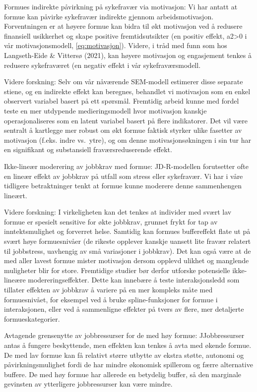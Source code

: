 \documentclass[
  12pt,
  a4paper,
  DIV=11,
  numbers=noendperiod]{scrartcl}
\begin{document}
Formues indirekte påvirkning på sykefravær via motivasjon: Vi har antatt
at formue kan påvirke sykefravær indirekte gjennom arbeidsmotivasjon.
Forventningen er at høyere formue kan bidra til økt motivasjon ved å
redusere finansiell usikkerhet og skape positive fremtidsutsikter (en
positiv effekt, a2\textgreater0 i vår motivasjonsmodell,
\autoref{eq:motivasjon}). Videre, i tråd med funn som hos Langseth-Eide
\& Vittersø (2021), kan høyere motivasjon og engasjement tenkes å
redusere sykefraværet (en negativ effekt i vår sykefraværsmodell.

Videre forskning: Selv om vår nåværende SEM-modell estimerer disse
separate stiene, og en indirekte effekt kan beregnes, behandlet vi
motivasjon som en enkel observert variabel basert på ett spørsmål.
Fremtidig arbeid kunne med fordel teste en mer utdypende
medieringsmodell hvor motivasjon kanskje operasjonaliseres som en latent
variabel basert på flere indikatorer. Det vil være sentralt å kartlegge
mer robust om økt formue faktisk styrker ulike fasetter av motivasjon
(f.eks. indre vs.~ytre), og om denne motivasjonsøkningen i sin tur har
en signifikant og substansiell fraværsreduserende effekt.

Ikke-lineær moderering av jobbkrav med formue: JD-R-modellen forutsetter
ofte en lineær effekt av jobbkrav på utfall som stress eller sykefravær.
Vi har i våre tidligere betraktninger tenkt at formue kunne moderere
denne sammenhengen lineært.

Videre forskning: I virkeligheten kan det tenkes at individer med svært
lav formue er spesielt sensitive for økte jobbkrav, grunnet frykt for
tap av inntektsmulighet og forverret helse. Samtidig kan formues
buffereffekt flate ut på svært høye formuesnivåer (de rikeste opplever
kanskje uansett lite fravær relatert til jobbstress, uavhengig av små
variasjoner i jobbkrav). Det kan også være at de med aller lavest formue
mister motivasjon dersom opplevd ulikhet og manglende muligheter blir
for store. Fremtidige studier bør derfor utforske potensielle
ikke-lineære modereringseffekter. Dette kan innebære å teste
interaksjonsledd som tillater effekten av jobbkrav å variere på en mer
kompleks måte med formuesnivået, for eksempel ved å bruke
spline-funksjoner for formue i interaksjonen, eller ved å sammenligne
effekter på tvers av flere, mer detaljerte formueskategorier.

Avtagende grensenytte av jobbressurser for de med høy formue:
JJobbressurser antas å fungere beskyttende, men effekten kan tenkes å
avta med økende formue. De med lav formue kan få relativt større utbytte
av ekstra støtte, autonomi og påvirkningsmulighet fordi de har mindre
økonomisk spillerom og færre alternative buffere. De med høy formue har
allerede en betydelig buffer, så den marginale gevinsten av ytterligere
jobbressurser kan være mindre.
\end{document}
